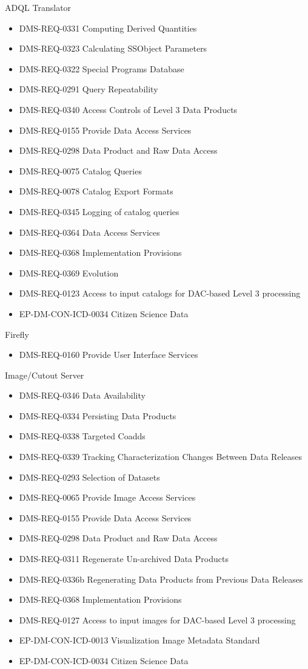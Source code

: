 ADQL Translator \begin{itemize}
\item DMS-REQ-0331 Computing Derived Quantities
\item DMS-REQ-0323 Calculating SSObject Parameters
\item DMS-REQ-0322 Special Programs Database
\item DMS-REQ-0291 Query Repeatability
\item DMS-REQ-0340 Access Controls of Level 3 Data Products
\item DMS-REQ-0155 Provide Data Access Services
\item DMS-REQ-0298 Data Product and Raw Data Access
\item DMS-REQ-0075 Catalog Queries
\item DMS-REQ-0078 Catalog Export Formats
\item DMS-REQ-0345 Logging of catalog queries
\item DMS-REQ-0364 Data Access Services
\item DMS-REQ-0368 Implementation Provisions
\item DMS-REQ-0369 Evolution
\item DMS-REQ-0123 Access to input catalogs for DAC-based Level 3 processing
\item EP-DM-CON-ICD-0034 Citizen Science Data
\end{itemize}
Firefly \begin{itemize}
\item DMS-REQ-0160 Provide User Interface Services
\end{itemize}
Image/Cutout Server \begin{itemize}
\item DMS-REQ-0346 Data Availability
\item DMS-REQ-0334 Persisting Data Products
\item DMS-REQ-0338 Targeted Coadds
\item DMS-REQ-0339 Tracking Characterization Changes Between Data Releases
\item DMS-REQ-0293 Selection of Datasets
\item DMS-REQ-0065 Provide Image Access Services
\item DMS-REQ-0155 Provide Data Access Services
\item DMS-REQ-0298 Data Product and Raw Data Access
\item DMS-REQ-0311 Regenerate Un-archived Data Products
\item DMS-REQ-0336b Regenerating Data Products from Previous Data Releases
\item DMS-REQ-0368 Implementation Provisions
\item DMS-REQ-0127 Access to input images for DAC-based Level 3 processing
\item EP-DM-CON-ICD-0013 Visualization Image Metadata Standard
\item EP-DM-CON-ICD-0034 Citizen Science Data
\end{itemize}
